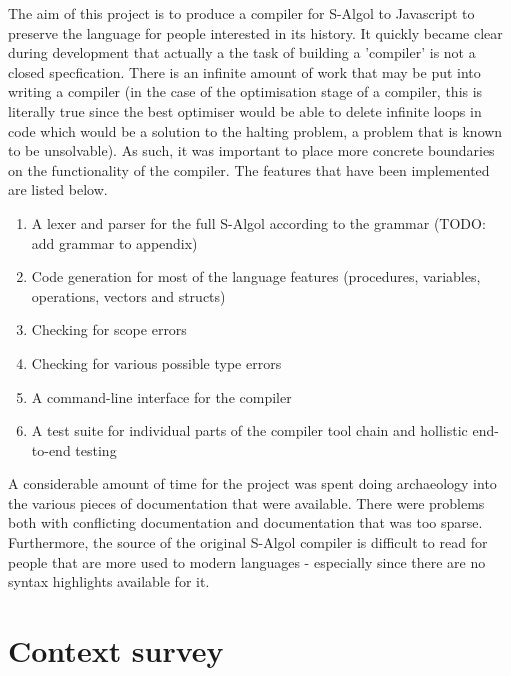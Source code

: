 \documentclass{article}
\begin{document}
The aim of this project is to produce a compiler for S-Algol to Javascript to preserve the language for people interested in its history. It quickly became clear during development that actually a the task of building a 'compiler' is not a closed specfication. There is an infinite amount of work that may be put into writing a compiler (in the case of the optimisation stage of a compiler, this is literally true since the best optimiser would be able to delete infinite loops in code which would be a solution to the halting problem, a problem that is known to be unsolvable). As such, it was important to place more concrete boundaries on the functionality of the compiler. The features that have been implemented are listed below.

\begin{enumerate}
\item A lexer and parser for the full S-Algol according to the grammar (TODO: add grammar to appendix)
\item Code generation for most of the language features (procedures, variables, operations, vectors and structs)
\item Checking for scope errors
\item Checking for various possible type errors
\item A command-line interface for the compiler
\item A test suite for individual parts of the compiler tool chain and hollistic end-to-end testing
\end{enumerate}

A considerable amount of time for the project was spent doing archaeology into the various pieces of documentation that were available. There were problems both with conflicting documentation and documentation that was too sparse. Furthermore, the source of the original S-Algol compiler is difficult to read for people that are more used to modern languages - especially since there are no syntax highlights available for it.


\section{Context survey}
\end{document}
